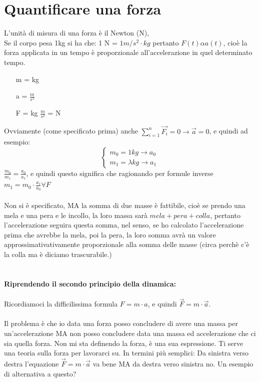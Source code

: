 \documentclass[12pt, a4paper, openany, oneside]{book}
\begin{document}
\section{Quantificare una forza}
L'unità di misura di una forza è il Newton (N), \\
Se il corpo pesa 1kg si ha che: 1 N = $1m/s^{2}\cdot kg$ pertanto $F(t) \alpha a(t)$,
cioè la forza applicata in un tempo è proporzionale all'accelerazione in quel
determinato tempo. 
\begin{itemize}
	\item [m] = kg
	\item [a] = $\frac{m}{s^{2}}$
	\item [F] = kg $\frac{m}{s^{2}}$ = N 
\end{itemize}
Ovviamente (come specificato prima) anche $\sum_{i=1}^n
\overrightarrow{F_{i}} = 0 \to \overrightarrow{a} = 0$, e quindi ad esempio:
\[
\begin{cases}
m_{0} = 1kg \to a_{0}\\
m_{1} = \lambda kg \to a_{1}
\end{cases}
\]
$\frac{m_{0}}{m_{1}} = \frac{a_{0}}{a_{1}}$, e quindi questo significa che 
ragionando per formule inverse $m_{1} = m_{0}\cdot \frac{a_{1}}{a_{0}} \forall F$
\\ \\
Non si è specificato, MA la somma di due masse è fattibile, cioè se prendo 
una mela e una pera e le incollo, la loro massa sarà $mela + pera + colla$, 
pertanto l'accelerazione seguira questa somma, nel senso, se ho calcolato
l'accelerazione prima che avrebbe la mela, poi la pera, la loro somma avrà un 
valore approssimativativamente proporzionale alla somma delle masse (circa perchè
c'è la colla ma è diciamo trascurabile.)
\\ \\
\paragraph{Riprendendo il secondo principio della dinamica: }
Ricordiamoci la difficilissima formula $F = m \cdot a $, e quindi 
$\overrightarrow{F} = m \cdot \overrightarrow{a}$. \\ \\
Il problema è che io data una forza posso concludere di avere una massa per un'accelerazione MA
non posso concludere data una massa ed accelerazione che ci sia quella forza.
Non mi sta definendo la forza, è una sua espressione. Ti serve una teoria sulla
forza per lavorarci su. In termini più semplici: Da sinistra verso destra l'equazione 
$\overrightarrow{F} = m \cdot \overrightarrow{a}$ va bene MA da destra verso
sinistra no. Un esempio di alternativa a questo? 
\end{document}
